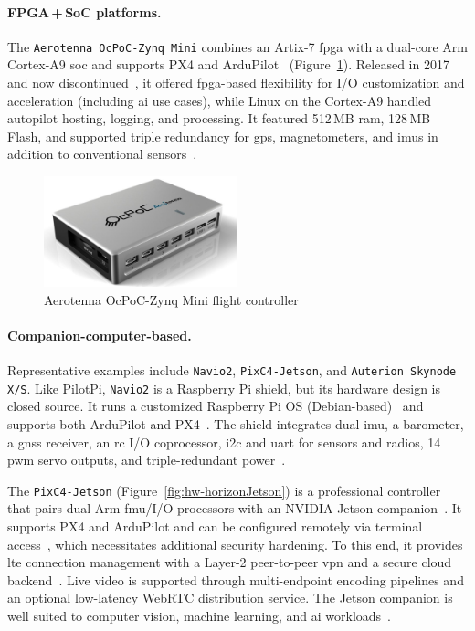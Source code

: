 \paragraph{FPGA\,+\,SoC platforms.}
The \lstinline|Aerotenna OcPoC-Zynq Mini| combines an Artix-7 \gls{fpga} with a dual-core Arm Cortex-A9 \gls{soc} and supports PX4 and ArduPilot~\cite{ocpoc} (Figure~\ref{fig:hw-ocpoc}). 
Released in 2017 and now discontinued~\cite{ocpoc-discontinued}, it offered \gls{fpga}-based flexibility for I/O customization and acceleration (including \gls{ai} use cases), while Linux on the Cortex-A9 handled autopilot hosting, logging, and processing. 
It featured 512\,MB \gls{ram}, 128\,MB Flash, and supported triple redundancy for \gls{gps}, magnetometers, and \glspl{imu} in addition to conventional sensors~\cite{ocpoc}.

\begin{figure}[!hbt]
  \centering
  \includegraphics[width=0.5\textwidth]{./img/png/hw-ocpoc-zynq-mini.png}
  \caption[Aerotenna OcPoC-Zynq Mini flight controller]{Aerotenna OcPoC-Zynq Mini flight controller~\cite{ocpoc}\footnotemark}
  \label{fig:hw-ocpoc}
\end{figure}
%

\paragraph{Companion-computer-based.}
Representative examples include \lstinline|Navio2|, \lstinline|PixC4-Jetson|, and \lstinline|Auterion Skynode X/S|.
Like PilotPi, \lstinline|Navio2| is a Raspberry Pi shield, but its hardware design is closed source. 
It runs a customized Raspberry Pi OS (Debian-based)~\cite{navio2-sw} and supports both ArduPilot and PX4~\cite{arduPilot-Navio2,navio2-px4}. 
The shield integrates dual \gls{imu}, a barometer, a \gls{gnss} receiver, an \gls{rc} I/O coprocessor, \gls{i2c} and \gls{uart} for sensors and radios, 14 \gls{pwm} servo outputs, and triple-redundant power~\cite{arduPilot-Navio2}.

The \lstinline|PixC4-Jetson| (Figure~\ref{fig:hw-horizonJetson}) is a professional controller that pairs dual-Arm \gls{fmu}/I/O processors with an NVIDIA Jetson companion~\cite{arduPilot-horizonJetson}. 
It supports PX4 and ArduPilot and can be configured remotely via terminal access~\cite{arduPilot-horizonJetson}, which necessitates additional security hardening. 
To this end, it provides \gls{lte} connection management with a Layer-2 peer-to-peer \gls{vpn} and a secure cloud backend~\cite{arduPilot-horizonJetson}. 
Live video is supported through multi-endpoint encoding pipelines and an optional low-latency WebRTC distribution service. 
The Jetson companion is well suited to computer vision, machine learning, and \gls{ai} workloads~\cite{jetson-docs}.

